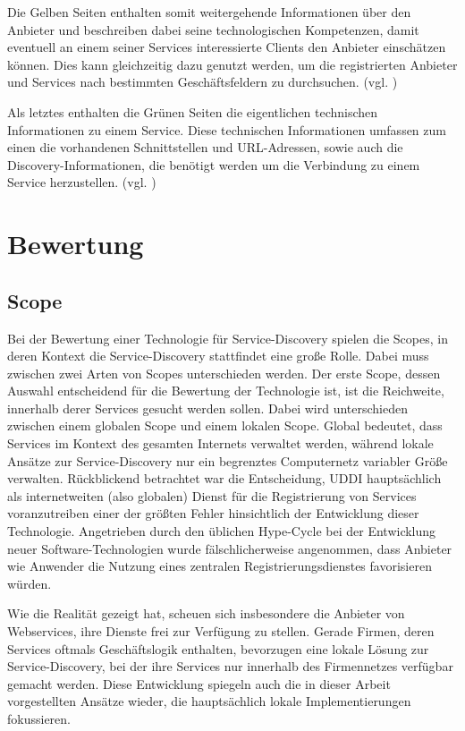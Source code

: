 \documentclass[conference,compsoc]{IEEEtran}
\begin{document}
Die Gelben Seiten enthalten somit weitergehende Informationen über den Anbieter und beschreiben dabei seine technologischen Kompetenzen, damit eventuell an einem seiner Services interessierte Clients den Anbieter einschätzen können. Dies kann gleichzeitig dazu genutzt werden, um die registrierten Anbieter und Services nach bestimmten Geschäftsfeldern zu durchsuchen. (vgl. \cite{UDDI-implementation})

Als letztes enthalten die Grünen Seiten die eigentlichen technischen Informationen zu einem Service. Diese technischen Informationen umfassen zum einen die vorhandenen Schnittstellen und URL-Adressen, sowie auch die Discovery-Informationen, die benötigt werden um die Verbindung zu einem Service herzustellen. (vgl. \cite{UDDI-implementation})

\section{Bewertung}

\subsection{Scope}

Bei der Bewertung einer Technologie für Service-Discovery spielen die Scopes, in deren Kontext die Service-Discovery stattfindet eine große Rolle. Dabei muss zwischen zwei Arten von Scopes unterschieden werden.
Der erste Scope, dessen Auswahl entscheidend für die Bewertung der Technologie ist, ist die Reichweite, innerhalb derer Services gesucht werden sollen. Dabei wird unterschieden zwischen einem globalen Scope und einem lokalen Scope. Global bedeutet, dass Services im Kontext des gesamten Internets verwaltet werden, während lokale Ansätze zur Service-Discovery nur ein begrenztes Computernetz variabler Größe verwalten. Rückblickend betrachtet war die Entscheidung, UDDI hauptsächlich als internetweiten (also globalen) Dienst für die Registrierung von Services voranzutreiben einer der größten Fehler hinsichtlich der Entwicklung dieser Technologie. Angetrieben durch den üblichen Hype-Cycle bei der Entwicklung neuer Software-Technologien wurde fälschlicherweise angenommen, dass Anbieter wie Anwender die Nutzung eines zentralen Registrierungsdienstes favorisieren würden.

Wie die Realität gezeigt hat, scheuen sich insbesondere die Anbieter von Webservices, ihre Dienste frei zur Verfügung zu stellen. Gerade Firmen, deren Services oftmals Geschäftslogik enthalten, bevorzugen eine lokale Lösung zur Service-Discovery, bei der ihre Services nur innerhalb des Firmennetzes verfügbar gemacht werden. Diese Entwicklung spiegeln auch die in dieser Arbeit vorgestellten Ansätze wieder, die hauptsächlich lokale Implementierungen fokussieren.
\end{document}
